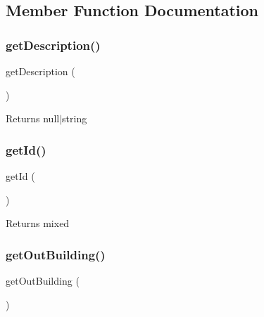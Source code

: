 \subsection{Member Function Documentation}
\mbox{\label{class_app_1_1_entity_1_1_own_out_building_a2e7bb35c71bf1824456ceb944cb7a845}} 
\subsubsection{\texorpdfstring{getDescription()}{getDescription()}}
{\footnotesize\ttfamily get\+Description (\begin{DoxyParamCaption}{ }\end{DoxyParamCaption})}

\begin{DoxyReturn}{Returns}
null$\vert$string 
\end{DoxyReturn}
\mbox{\label{class_app_1_1_entity_1_1_own_out_building_a12251d0c022e9e21c137a105ff683f13}} 
\subsubsection{\texorpdfstring{getId()}{getId()}}
{\footnotesize\ttfamily get\+Id (\begin{DoxyParamCaption}{ }\end{DoxyParamCaption})}

\begin{DoxyReturn}{Returns}
mixed 
\end{DoxyReturn}
\mbox{\label{class_app_1_1_entity_1_1_own_out_building_a4bad965fdaae53c2636fc63ca1502f78}} 
\subsubsection{\texorpdfstring{getOutBuilding()}{getOutBuilding()}}
{\footnotesize\ttfamily get\+Out\+Building (\begin{DoxyParamCaption}{ }\end{DoxyParamCaption})}

